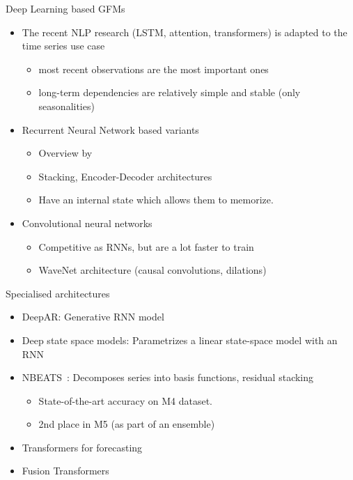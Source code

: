 \documentclass{beamer}
\begin{document}
 \begin{frame}{Deep Learning based GFMs}
   	\begin{itemize}
    			\item  The recent NLP research (LSTM, attention, transformers) is adapted to the time series use case
  				\begin{itemize}\color{blue}
						\item most recent observations are the most important ones
						\item long-term dependencies are relatively simple and stable (only seasonalities)
				\end{itemize}
   		 	\item  Recurrent Neural Network based variants
   		 		\begin{itemize}\color{blue}
						\item Overview by~\cite{Hewamalage2021-hg}
						\item Stacking, Encoder-Decoder architectures 
						\item Have an internal state which allows them to memorize.
				\end{itemize}
			\item  Convolutional neural networks
   		 		\begin{itemize}\color{blue}
						\item Competitive as RNNs, but are a lot faster to train~\cite{Borovykh2017-le}
						\item WaveNet architecture (causal convolutions, dilations)~\cite{Sen2019-jj}
				\end{itemize}
 	\end{itemize}
\end{frame} 

 \begin{frame}{Specialised architectures}
   	\begin{itemize}
    			\item  DeepAR: Generative RNN model~\cite{Salinas2020-dz}
    			  \vspace{2.0mm}
   		 	\item  Deep state space models: Parametrizes a linear state-space model with an RNN~\cite{Rangapuram2018-zq}
   		 	  \vspace{2.0mm}
   		 	\item  NBEATS~\cite{Oreshkin2019-tq}: Decomposes series into basis functions, residual stacking
   		 		\begin{itemize}\color{blue}
						\item State-of-the-art accuracy on M4 dataset.
						\item 2nd place in M5 (as part of an ensemble)
				\end{itemize}
			\item  Transformers for forecasting~\cite{Li2019-io}
			\item  Fusion Transformers~\cite{Lim2021-il}
 	\end{itemize}
\end{frame} 
\end{document}
